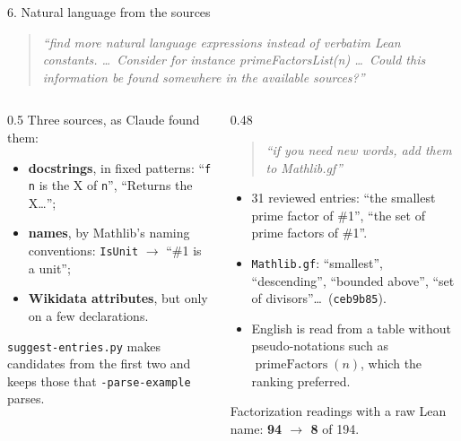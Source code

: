 \documentclass[10pt,aspectratio=169]{beamer}
\newcommand{\commit}[1]{\texttt{\footnotesize #1}}
\newcommand{\prompt}[1]{\begin{quote}\small\itshape ``#1''\end{quote}}
\begin{document}
\begin{frame}{6. Natural language from the sources}
  \footnotesize
  \prompt{find more natural language expressions instead of verbatim Lean
  constants. \ldots\ Consider for instance primeFactorsList(n) \ldots\ Could
  this information be found somewhere in the available sources?}
  \begin{columns}[T]
    \begin{column}{0.5\textwidth}
      Three sources, as Claude found them:
      \begin{itemize}
        \item \textbf{docstrings}, in fixed patterns: ``\texttt{f n} is the X of
              \texttt{n}'', ``Returns the X\ldots'';
        \item \textbf{names}, by Mathlib's naming conventions:
              \texttt{IsUnit} $\to$ ``\#1 is a unit'';
        \item \textbf{Wikidata attributes}, but only on a few declarations.
      \end{itemize}
      \texttt{suggest-entries.py} makes candidates from the first two and keeps
      those that \texttt{-parse-example} parses.
    \end{column}
    \begin{column}{0.48\textwidth}
      \prompt{if you need new words, add them to Mathlib.gf}
      \begin{itemize}
        \item 31 reviewed entries: ``the smallest prime factor of \#1'',
              ``the set of prime factors of \#1''.
        \item \texttt{Mathlib.gf}: ``smallest'', ``descending'', ``bounded
              above'', ``set of divisors''\ldots\ (\commit{ceb9b85}).
        \item English is read from a table without pseudo-notations such as
              $\operatorname{primeFactors}(n)$, which the ranking preferred.
      \end{itemize}
      Factorization readings with a raw Lean name: \textbf{94 $\to$ 8} of 194.
    \end{column}
  \end{columns}
\end{frame}
\end{document}
